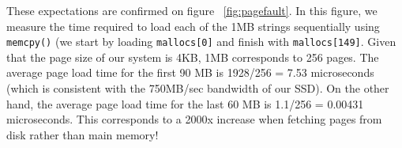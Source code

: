 These expectations are confirmed on figure ~\ref{fig:pagefault}. In this figure, we measure the time required to load each of the 1MB strings sequentially using \texttt{memcpy()} (we start by loading \texttt{mallocs[0]} and finish with \texttt{mallocs[149]}. 
Given that the page size of our system is 4KB, 1MB corresponds to 256 pages. The average page load time for the first 90 MB is 1928/256 = 7.53  microseconds (which is consistent with the 750MB/sec bandwidth of our SSD). On the other hand, the average page load time for the last 60 MB is 1.1/256 = 0.00431  microseconds. This corresponds to a 2000x increase when fetching pages from disk rather than main memory!